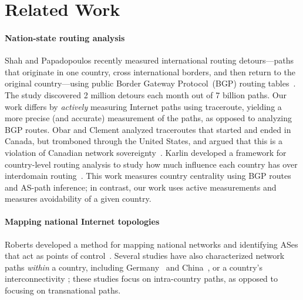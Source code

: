 \section{Related Work}
\label{related}

\paragraph{Nation-state routing analysis}  Shah and
Papadopoulos recently measured international routing detours---paths that originate
in
one country, cross international borders, and then return to the
original country---using public Border Gateway Protocol~(BGP) routing tables~\cite
{shah2015characterizing}. 
The study discovered 2 million detours each month out
of 7 billion paths.
Our work differs by {\em actively}
measuring Internet paths using traceroute, yielding a more precise (and accurate) measurement of the paths, %
as opposed to analyzing BGP
routes.  Obar and Clement analyzed traceroutes
that started and ended in Canada, but tromboned through the United
States, and argued that
this is a violation of Canadian network
sovereignty~\cite{obar2012internet}. 
Karlin \ea{} developed a framework for country-level
routing analysis to study how much influence each country has over
interdomain routing~\cite{karlin2009nation}.  This work measures country
centrality using BGP routes and AS-path inference; in contrast, our work uses active 
measurements and measures avoidability of a given country. 

\paragraph{Mapping national Internet topologies}  Roberts \ea{} developed a method
for mapping national networks and identifying ASes that act as points of
control~\cite{roberts2011mapping}.   %
 Several studies have also characterized network paths {\em
within} a country, including
Germany~\cite{wahlisch2010framework,wahlisch2012exposing} and
China~\cite{zhou2007chinese}, or a country's interconnectivity %
\cite{bischof2015and,gupta2014peering,fanou2015diversity}; these studies
focus on intra-country paths, as opposed to focusing on
transnational paths.

